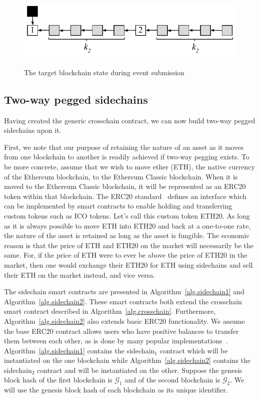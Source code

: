 \begin{figure}
    \caption{The target blockchain state during event submission}
    \centering
    \includegraphics[width=0.6 \columnwidth,keepaspectratio]{figures/contestation.pdf}
    \label{fig.contestation}
\end{figure}

\subsection*{Two-way pegged sidechains}
Having created the generic crosschain contract, we can now build two-way pegged
sidechains upon it.

First, we note that our purpose of retaining the nature of an asset as it moves
from one blockchain to another is readily achieved if two-way pegging exists. To
be more concrete, assume that we wish to move ether (ETH), the native currency
of the Ethereum blockchain, to the Ethereum Classic blockchain. When it is moved
to the Ethereum Classic blockchain, it will be represented as an ERC20 token
within that blockchain. The ERC20 standard~\cite{erc20} defines an interface
which can be implemented by smart contracts to enable holding and transferring
custom tokens such as ICO tokens. Let's call this custom token ETH20. As long as
it is always possible to move ETH into ETH20 and back at a one-to-one rate, the
nature of the asset is retained as long as the asset is fungible. The economic
reason is that the price of ETH and ETH20 on the market will necessarily be the
same. For, if the price of ETH were to ever be above the price of ETH20 in the
market, then one would exchange their ETH20 for ETH using sidechains and sell
their ETH on the market instead, and vice versa.

The sidechain smart contracts are presented in Algorithm~\ref{alg.sidechain1}
and Algorithm~\ref{alg.sidechain2}. These smart contracts both extend the
\textsf{crosschain} smart contract described in Algorithm~\ref{alg.crosschain}.
Furthermore, Algorithm~\ref{alg.sidechain2} also extends basic ERC20
functionality. We assume the base ERC20 contract allows users who have positive
balances to transfer them between each other, as is done by many popular
implementations~\cite{openzeppelin}. Algorithm~\ref{alg.sidechain1} contains the
\textsf{sidechain}$_1$ contract which will be instantiated on the one blockchain
while Algorithm~\ref{alg.sidechain2} contains the \textsf{sidechain}$_2$
contract and will be instantiated on the other. Suppose the genesis block hash
of the first blockchain is $\mathcal{G}_1$ and of the second blockchain is
$\mathcal{G}_2$. We will use the genesis block hash of each blockchain as its
unique identifier.

